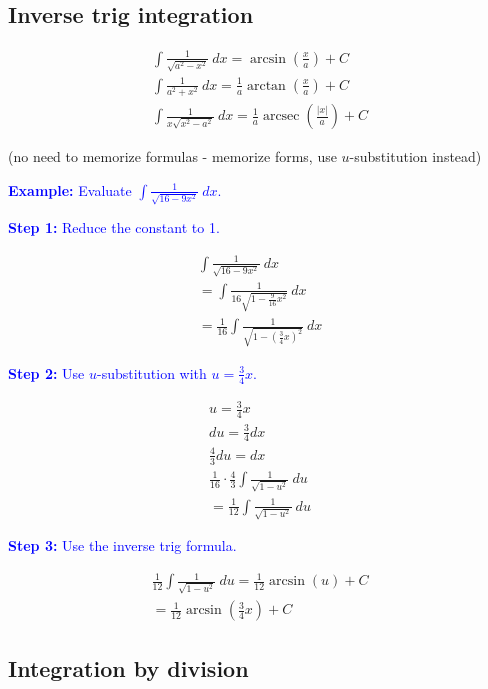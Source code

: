 \documentclass[letterpaper, 12pt]{article}
\DeclareMathOperator{\arcsec}{arcsec}
\newcommand{\example}[1]{\textcolor{blue}{\textbf{Example:} #1}}
\newcommand{\step}[2]{\textcolor{blue}{\textbf{Step #1:} #2}}
\begin{document}
\subsection*{Inverse trig integration}

\begin{gather*}
\int \frac{1}{\sqrt{a^2 - x^2}} \: dx = \arcsin \left( \frac{x}{a} \right) + C \\
\int \frac{1}{a^2 + x^2} \: dx = \frac{1}{a} \arctan \left( \frac{x}{a} \right) + C \\
\int \frac{1}{x \sqrt{x^2 - a^2}} \: dx = \frac{1}{a} \arcsec \left( \frac{|x|}{a} \right) + C
\end{gather*}

(no need to memorize formulas - memorize forms, use $u$-substitution instead)

\example{Evaluate $\displaystyle \int \frac{1}{\sqrt{16 - 9x^2}} \: dx$.}

\step{1}{Reduce the constant to 1.}

\begin{gather*}
\int \frac{1}{\sqrt{16 - 9x^2}} \: dx \\
= \int \frac{1}{16\sqrt{1 - \frac{9}{16}x^2}} \: dx \\
= \frac{1}{16} \int \frac{1}{\sqrt{1 - \left(\frac{3}{4}x\right)^2}} \: dx
\end{gather*}

\step{2}{Use $u$-substitution with $u = \frac{3}{4}x$.}

\begin{gather*}
u = \frac{3}{4}x \\
du = \frac{3}{4} dx \\
\frac{4}{3} du = dx \\
\frac{1}{16} \cdot \frac{4}{3} \int \frac{1}{\sqrt{1 - u^2}} \: du \\
= \frac{1}{12} \int \frac{1}{\sqrt{1 - u^2}} \: du
\end{gather*}

\step{3}{Use the inverse trig formula.}

\begin{gather*}
\frac{1}{12} \int \frac{1}{\sqrt{1 - u^2}} \: du = \frac{1}{12} \arcsin(u) + C \\
= \boxed{\frac{1}{12} \arcsin\left(\frac{3}{4}x\right) + C}
\end{gather*}

\subsection*{Integration by division}
\end{document}
